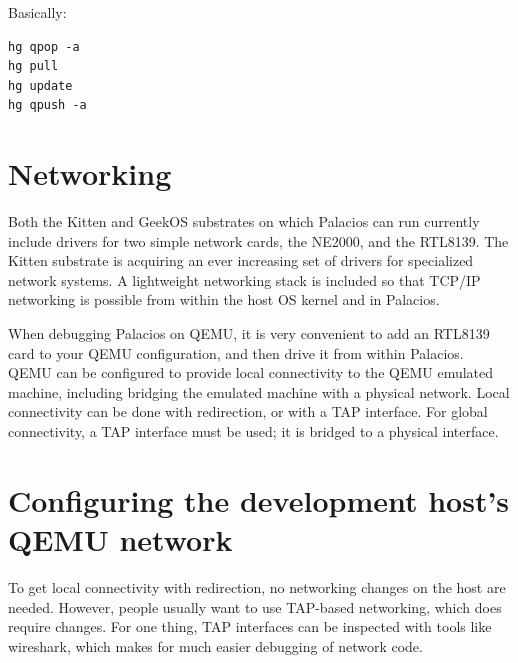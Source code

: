 \documentclass[11pt]{article}
\begin{document}
Basically:
\begin{verbatim}
hg qpop -a
hg pull
hg update
hg qpush -a
\end{verbatim}




\section{Networking}

Both the Kitten and GeekOS substrates on which Palacios can run
currently include drivers for two simple network cards, the NE2000,
and the RTL8139.  The Kitten substrate is acquiring an ever increasing
set of drivers for specialized network systems.   A lightweight
networking stack is included so that TCP/IP networking is possible
from within the host OS kernel and in Palacios.  

When debugging Palacios on QEMU, it is very convenient to add an
RTL8139 card to your QEMU configuration, and then drive it from within
Palacios.  QEMU can be configured to provide local connectivity to the
QEMU emulated machine, including bridging the emulated machine with a
physical network.  Local connectivity can be done with redirection, or
with a TAP interface.  For global connectivity, a TAP interface must
be used; it is bridged to a physical interface.

\section{Configuring the development host's QEMU network}

To get local connectivity with redirection, no networking changes on
the host are needed.  However, people usually want to use TAP-based
networking, which does require changes.  For one thing, TAP interfaces
can be inspected with tools like wireshark, which makes for much
easier debugging of network code.
\end{document}
